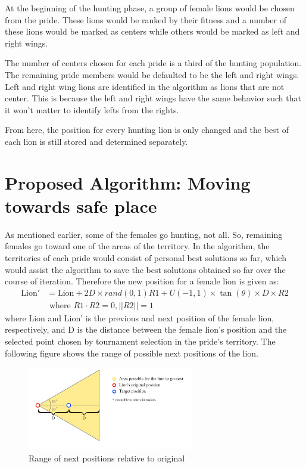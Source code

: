 \par At the beginning of the hunting phase, a group of female lions would be chosen from the pride. These lions would be ranked by their fitness and a number of these lions would be marked as centers while others would be marked as left and right wings.

\par The number of centers chosen for each pride is a third of the hunting population. The remaining pride members would be defaulted to be the left and right wings. Left and right wing lions are identified in the algorithm as lions that are not center. This is because the left and right wings have the same behavior such that it won't matter to identify lefts from the rights.

\par From here, the position for every hunting lion is only changed and the best of each lion is still stored and determined separately.

\section{Proposed Algorithm: Moving towards safe place}

\par As mentioned earlier, some of the females go hunting, not all. So, remaining females go toward one of the areas of the territory. In the algorithm, the territories of each pride would consist of personal best solutions so far, which would assist the algorithm to save the best solutions obtained so far over the course of iteration.
Therefore the new position for a female lion is given as:
\begin{align*}
\text{Lion}' &= \text{Lion} + 2D \times rand(0,1){R1} + U(-1,1) \times \tan(\theta) \times D \times {R2} \\
&\text{  where } R1 \cdot R2 = 0, ||R2|| = 1
\end{align*}
where Lion and Lion' is the previous and next position of the female lion, respectively, and D is the distance between the female lion's position and the selected point chosen by tournament selection in the pride's territory. The following figure shows the range of possible next positions of the lion.

\begin{figure}[h]
\begin{center}
\includegraphics[width=0.65\textwidth]{img/moving/moving}
\caption{Range of next positions relative to original}
\end{center}
\end{figure}

